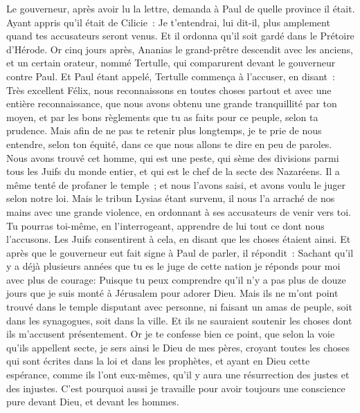 \begin{multicols}{2}
Le gouverneur, après avoir lu la lettre, demanda à Paul de quelle province il était. Ayant appris qu'il était de Cilicie~:
Je t'entendrai, lui dit-il, plus amplement quand tes accusateurs seront venus. Et il ordonna qu'il soit gardé dans le Prétoire d'Hérode.
\VerseOne{}Or cinq jours après, Ananias le grand-prêtre descendit avec les anciens, et un certain orateur, nommé Tertulle, qui comparurent devant le gouverneur contre Paul. 
Et Paul étant appelé, Tertulle commença à l'accuser, en disant~:
Très excellent Félix, nous reconnaissons en toutes choses partout et avec une entière reconnaissance, que nous avons obtenu une grande tranquillité par ton moyen, et par les bons règlements que tu as faits pour ce peuple, selon ta prudence.
Mais afin de ne pas te retenir plus longtemps, je te prie de nous entendre, selon ton équité, dans ce que nous allons te dire en peu de paroles.
Nous avons trouvé cet homme, qui est une peste, qui sème des divisions parmi tous les Juifs du monde entier, et qui est le chef de la secte des Nazaréens.
Il a même tenté de profaner le temple~; et nous l'avons saisi, et avons voulu le juger selon notre loi.
Mais le tribun Lysias étant survenu, il nous l'a arraché de nos mains avec une grande violence,
en ordonnant à ses accusateurs de venir vers toi. Tu pourras toi-même, en l'interrogeant, apprendre de lui tout ce dont nous l'accusons.
Les Juifs consentirent à cela, en disant que les choses étaient ainsi.
Et après que le gouverneur eut fait signe à Paul de parler, il répondit~: Sachant qu'il y a déjà plusieurs années que tu es le juge de cette nation je réponds pour moi avec plus de courage:
Puisque tu peux comprendre qu'il n'y a pas plus de douze jours que je suis monté à Jérusalem pour adorer Dieu.
Mais ils ne m'ont point trouvé dans le temple disputant avec personne, ni faisant un amas de peuple, soit dans les synagogues, soit dans la ville. 
Et ils ne sauraient soutenir les choses dont ils m'accusent présentement.
Or je te confesse bien ce point, que selon la voie qu'ils appellent secte, je sers ainsi le Dieu de mes pères, croyant toutes les choses qui sont écrites dans la loi et dans les prophètes,
et ayant en Dieu cette espérance, comme ils l'ont eux-mêmes, qu'il y aura une résurrection des justes et des injustes.
C'est pourquoi aussi je travaille pour avoir toujours une conscience pure devant Dieu, et devant les hommes.

\end{multicols}
